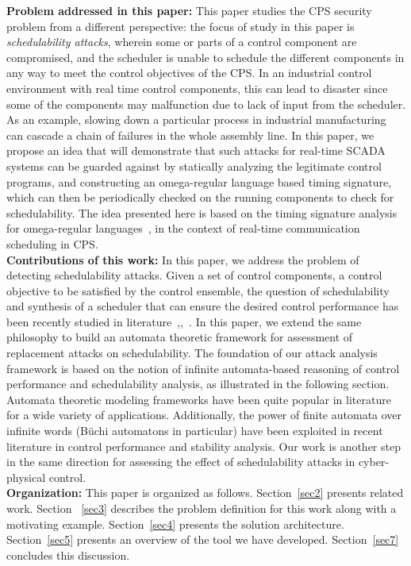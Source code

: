 \noindent
{\bf Problem addressed in this paper:} This paper studies the CPS security problem from a different perspective: the focus of study in this paper is {\em schedulability attacks}, wherein some or parts of a control component are compromised, and the scheduler is unable to schedule the different components in any way to meet the control objectives of the CPS.  In an industrial control environment with real time control components, this can lead to disaster since some of the components may malfunction due to lack of input from the scheduler. As an example, slowing down a
particular process in industrial manufacturing can cascade a chain of failures in the whole
assembly line. In this paper, we propose an idea that will demonstrate that such
attacks for real-time SCADA systems can be guarded against by statically analyzing the
legitimate control programs, and constructing an omega-regular language based timing signature,
which can then be periodically checked on the running components to check for schedulability. The idea presented here is based on the timing signature analysis for omega-regular languages~\cite{WeissFAA09}, in the context of real-time communication scheduling in CPS. \\

\noindent
{\bf Contributions of this work:}
In this paper, we address the problem of detecting schedulability attacks. Given a set of control components, a control objective 
to be satisfied by the control ensemble, the question of schedulability and 
synthesis of a scheduler that can ensure the desired control performance has been recently studied in literature~\cite{WeissFAA09},\cite{AlurW08},~\cite{GhoshMDHD16}. 
In this paper, we extend the same philosophy to build an automata theoretic framework for assessment of replacement attacks on schedulability. The foundation of our attack analysis framework is based on the notion of infinite automata-based reasoning of control performance and schedulability analysis, as illustrated in the following section. Automata theoretic modeling frameworks have been quite popular in literature for a wide variety of applications. Additionally, the power of finite automata over infinite words (B\"{u}chi automatons in particular) have been exploited in recent literature in control performance and stability analysis. Our work is another step in the same direction for assessing the effect of schedulability attacks in cyber-physical control. \\


\noindent
{\bf Organization:} This paper is organized as follows. Section~\ref{sec2} presents related work. Section ~\ref{sec3} describes the problem definition for this work along with a motivating example. Section~\ref{sec4} presents the solution architecture. Section~\ref{sec5} presents an overview of the tool we have developed. Section~\ref{sec7} concludes this discussion.
